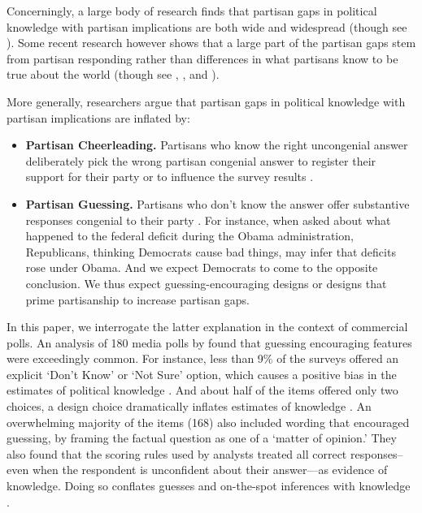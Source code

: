 \documentclass[12pt, letterpaper]{article}
\begin{document}
Concerningly, a large body of research finds that partisan gaps in political knowledge with partisan implications are both wide and widespread \citep{bartels_2002, jerit2012partisan, pew2018disagree, lodgetaber_2013} (though see \citet{roush2023}). Some recent research however shows that a large part of the partisan gaps stem from partisan responding rather than differences in what partisans know to be true about the world \citep{bullocketal_2015, prior2015you, huber_yair_2018, graham2023less} (though see \citet{peterson2021partisan}, \citet{berinsky_2017}, and \citet{malka2022expressive}). 

More generally, researchers argue that partisan gaps in political knowledge with partisan implications are inflated by: 

\begin{itemize}

    \item \textbf{Partisan Cheerleading.} Partisans who know the right uncongenial answer deliberately pick the wrong partisan congenial answer to register their support for their party or to influence the survey results \citep{prior2015you}.

    \item \textbf{Partisan Guessing.} Partisans who don't know the answer offer substantive responses congenial to their party \citep{bullocketal_2015, graham2023less}. For instance, when asked about what happened to the federal deficit during the Obama administration, Republicans, thinking Democrats cause bad things, may infer that deficits rose under Obama. And we expect Democrats to come to the opposite conclusion. We thus expect guessing-encouraging designs or designs that prime partisanship to increase partisan gaps.

\end{itemize}

In this paper, we interrogate the latter explanation in the context of commercial polls. An analysis of 180 media polls by \citet{luskinetal_nd} found that guessing encouraging features were exceedingly common. For instance, less than 9\% of the surveys offered an explicit `Don't Know' or `Not Sure' option, which causes a positive bias in the estimates of political knowledge \citep{luskin2011don}. And about half of the items offered only two choices, a design choice dramatically inflates estimates of knowledge \citep{bullock2022response}. An overwhelming majority of the items (168) also included wording that encouraged guessing, by framing the factual question as one of a `matter of opinion.' They also found that the scoring rules used by analysts treated all correct responses--even when the respondent is unconfident about their answer---as evidence of knowledge. Doing so conflates guesses and on-the-spot inferences with knowledge \citep{pasek2015}. 
\end{document}
